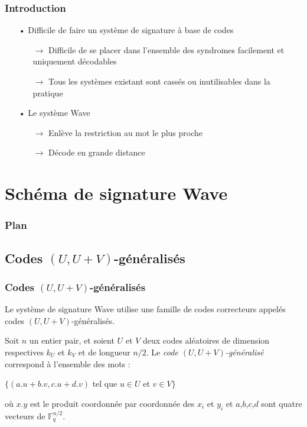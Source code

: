 \documentclass[10pt,a4paper]{beamer}
\theoremstyle{plain}
\theoremstyle{definition}
\newcommand{\F}{\mathbb{F}}
\begin{document}
\begin{frame}
\frametitle{Introduction}
\begin{itemize}    
\item[•] Difficile de faire un système de signature à base de codes 
       \begin{itemize}
       \item[$\rightarrow$] Difficile de se placer dans l'ensemble des syndromes facilement et \\uniquement décodables
       \item[$\rightarrow$] Tous les systèmes existant sont cassés ou inutilisables dans la pratique
       \end{itemize}
\vspace{0.2in}
\item[•] Le système Wave
       \begin{itemize}
       \item[$\rightarrow$] Enlève la restriction au mot le plus proche
       \item[$\rightarrow$]Décode en grande distance
       \end{itemize}
\end{itemize}   

\end{frame}

\section{Schéma de signature Wave}
\begin{frame}
  \frametitle{Plan}
  \tableofcontents[currentsection,subsectionstyle=hide]
\end{frame}

\subsection{Codes $(U,U+V)$-généralisés}

\begin{frame}
\frametitle{Codes $(U,U+V)$-généralisés} 

Le système de signature Wave utilise une famille de codes correcteurs appelés codes $(U,U+V)$-généralisés.
\vspace{0.15in}
\begin{block}{}
Soit $n$ un entier pair, et soient $U$ et $V$ deux codes aléatoires de dimension respectives $k_U$ et $k_V$ et de longueur $n/2$. Le \textit{code $(U,U+V)$-généralisé } correspond à l'ensemble des mots :
\begin{center}
$ \{(a.u + b.v, c.u + d.v)$ tel que $u \in U$ et $v \in V \}$
\end{center}
\vspace{0.1in}
où $x.y$ est le produit coordonnée par coordonnée des $x_i$ et $y_i$ et $a$,$b$,$c$,$d$ sont quatre vecteurs de $\F_q^{n/2}$.
\end{block}
\end{frame}
\end{document}
